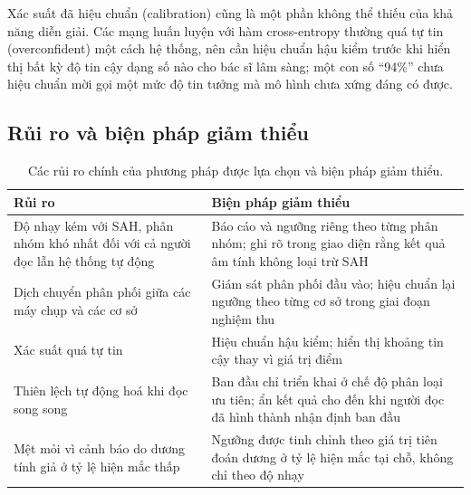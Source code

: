 Xác suất đã hiệu chuẩn (calibration) cũng là một phần không thể thiếu của khả
năng diễn giải. Các mạng huấn luyện với hàm cross-entropy thường quá tự tin
(overconfident) một cách hệ thống, nên cần hiệu chuẩn hậu kiểm trước khi hiển thị
bất kỳ độ tin cậy dạng số nào cho bác sĩ lâm sàng; một con số ``94\%'' chưa hiệu
chuẩn mời gọi một mức độ tin tưởng mà mô hình chưa xứng đáng có được.

\subsection{Rủi ro và biện pháp giảm thiểu}

\begin{table}[H]
\centering
\small
\begin{tabularx}{\textwidth}{@{}X X@{}}
\toprule
\textbf{Rủi ro} & \textbf{Biện pháp giảm thiểu} \\
\midrule
Độ nhạy kém với SAH, phân nhóm khó nhất đối với cả người đọc lẫn hệ thống tự động & Báo cáo và ngưỡng riêng theo từng phân nhóm; ghi rõ trong giao diện rằng kết quả âm tính không loại trừ SAH \\
Dịch chuyển phân phối giữa các máy chụp và các cơ sở & Giám sát phân phối đầu vào; hiệu chuẩn lại ngưỡng theo từng cơ sở trong giai đoạn nghiệm thu \\
Xác suất quá tự tin & Hiệu chuẩn hậu kiểm; hiển thị khoảng tin cậy thay vì giá trị điểm \\
Thiên lệch tự động hoá khi đọc song song & Ban đầu chỉ triển khai ở chế độ phân loại ưu tiên; ẩn kết quả cho đến khi người đọc đã hình thành nhận định ban đầu \\
Mệt mỏi vì cảnh báo do dương tính giả ở tỷ lệ hiện mắc thấp & Ngưỡng được tinh chỉnh theo giá trị tiên đoán dương ở tỷ lệ hiện mắc tại chỗ, không chỉ theo độ nhạy \\
\bottomrule
\end{tabularx}
\caption{Các rủi ro chính của phương pháp được lựa chọn và biện pháp giảm thiểu.}
\label{tab:risks}
\end{table}
